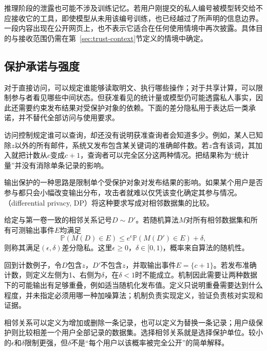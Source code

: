 推理阶段的泄露也可能不涉及训练记忆。若用户刚提交的私人编号被模型转交给不应接收它的工具，即使模型从未用该编号训练，也已经越过了所声明的信息边界。一段内容出现在公开网页上，也不表示它适合在任何使用情境中再次披露。具体目的与接收范围仍需在第~\ref{sec:trust-context}节定义的情境中确定。

\subsection{保护承诺与强度}
\label{sec:privacy-guarantees}

对于直接访问，可以规定谁能够读取明文、执行哪些操作；对于共享计算，可以限制参与者看见哪些中间状态。但获准看见的统计量或模型仍可能透露私人事实，因此还需要约束发布结果对受保护对象的依赖。下面的差分隐私用于表达后一类承诺，并不替代全部访问与使用要求。

访问控制规定谁可以查询，却还没有说明获准查询者会知道多少。例如，某人已知除$z$以外的所有邮件，系统又发布包含某关键词的准确邮件数。若$z$含有该词，其加入就把计数从$c$变成$c+1$，查询者可以完全区分这两种情况。把结果称为“统计量”并没有消除单条记录的影响。

输出保护的一种思路是限制单个受保护对象对发布结果的影响。如果某个用户是否参与都只会小幅改变输出分布，攻击者就难以仅凭该变化确定其参与情况。（differential privacy, DP）将这种要求写成对相邻数据集的比较。

\begin{definition}[差分隐私]
\label{def:privacy-dp}
给定与第一卷一致的相邻关系记号$D\sim D'$。若随机算法$M$对所有相邻数据集和所有可测输出事件$E$均满足
\begin{equation}
 \mathbb P(M(D)\in E)
 \leq e^\epsilon\mathbb P(M(D')\in E)+\delta,
 \label{eq:privacy-definition}
\end{equation}
则称其满足$(\epsilon,\delta)$差分隐私。这里$\epsilon\geq0$，$\delta\in[0,1)$，概率来自算法的随机性。
\end{definition}

回到计数例子，令$D$包含$z$，$D'$不包含$z$，并取输出事件$E=\{c+1\}$。若发布准确计数，则定义左侧为1、右侧为$\delta$，在$\delta<1$时不能成立。机制因此需要让两种数据下的可能输出有足够重叠，例如适当随机化发布值。定义只说明重叠需要达到什么程度，并未指定必须用哪一种加噪算法；机制负责实现定义，验证负责核对实现和证据。

相邻关系可以定义为增加或删除一条记录，也可以定义为替换一条记录；用户级保护则比较相差一个用户全部记录的数据集。选择相邻关系就是选择保护单位。较小的$\epsilon$和$\delta$限制更强，但$\delta$不是“每个用户以该概率被完全公开”的简单解释。

